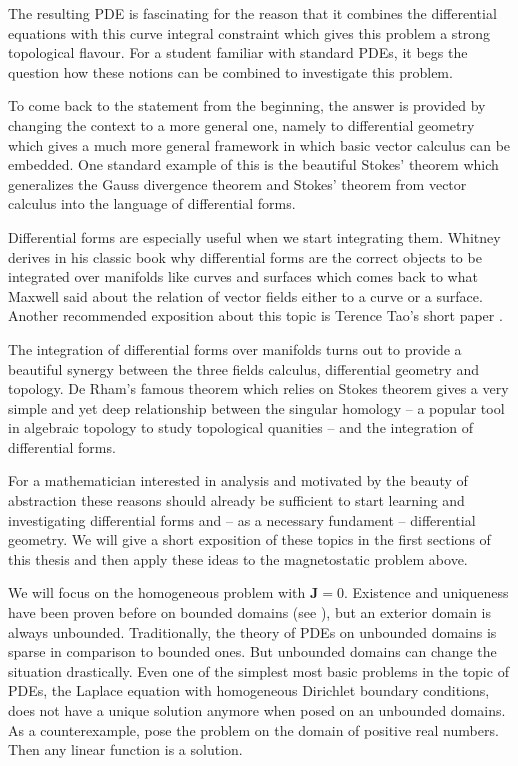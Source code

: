 \documentclass[../master_thesis.tex]{subfiles}
\begin{document}
The resulting PDE is fascinating for the reason that it combines the differential 
equations with this curve integral constraint which gives this problem 
a strong topological flavour. For a student familiar with standard PDEs, it 
begs the question how these notions can be combined to investigate this problem.

To come back to the statement from the beginning, the answer is provided 
by changing the context to a more general one, namely to differential geometry which
gives a much more general framework in which basic vector calculus can 
be embedded. One standard example of this is the beautiful Stokes' theorem 
which generalizes the Gauss divergence theorem and Stokes' theorem from vector calculus 
into the language of differential forms.

Differential forms are especially useful when we start integrating them. 
Whitney derives in his classic book \cite{whitney} why differential forms are
the correct objects to be integrated over manifolds like curves and surfaces which comes back 
to what Maxwell said about the relation 
of vector fields either to a curve or a surface. 
Another recommended exposition about this topic is Terence Tao's short paper \cite{terence_tao}. 

The integration of differential forms over manifolds turns out to provide 
a beautiful synergy between the three fields 
calculus, differential geometry and topology. De Rham's famous theorem which 
relies on Stokes theorem 
gives a very simple and yet deep relationship between the singular homology -- 
a popular tool in algebraic topology to study topological quanities -- 
and the integration of differential forms.

For a mathematician interested in analysis and motivated by the beauty of abstraction 
these reasons should already be sufficient to start learning and investigating 
differential forms and -- as a necessary fundament -- differential geometry. We will 
give a short exposition of these topics in the first sections of this thesis 
and then apply these ideas to the magnetostatic problem above.

We will focus on the homogeneous problem with $\mathbf{J} = 0$.
Existence and uniqueness have been proven before on bounded domains 
(see \cite[Thm.\,5.4]{mitrea_layer_potentials}),
but an exterior domain is always unbounded. 
Traditionally, the theory of PDEs on unbounded domains 
is sparse in comparison to bounded ones. But unbounded domains can change the 
situation drastically. Even one of the simplest most basic problems in the topic 
of PDEs, the Laplace equation with homogeneous Dirichlet boundary conditions, does not 
have a unique solution anymore when posed on an unbounded domains. As a counterexample,
pose the problem on the domain of positive real numbers. Then any linear function 
is a solution.
\end{document}
